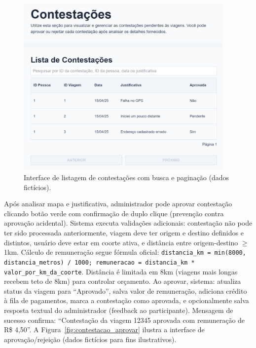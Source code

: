  \begin{figure}[H]
   \centering
   \includegraphics[width=0.95\textwidth]{figuras/contestacoes_listar.png}
   \caption{Interface de listagem de contestações com busca e paginação (dados fictícios).}
   \label{fig:contestacoes_listagem}
 \end{figure}



Após analisar mapa e justificativa, administrador pode aprovar contestação clicando botão verde com confirmação de duplo clique (prevenção contra aprovação acidental). Sistema executa validações adicionais: contestação não pode ter sido processada anteriormente, viagem deve ter origem e destino definidos e distintos, usuário deve estar em coorte ativa, e distância entre origem-destino $\geq$ 1km. Cálculo de remuneração segue fórmula oficial: \texttt{distancia\_km = min(8000, distancia\_metros) / 1000; remuneracao = distancia\_km * valor\_por\_km\_da\_coorte}. Distância é limitada em 8km (viagens mais longas recebem teto de 8km) para controlar orçamento. Ao aprovar, sistema: atualiza status da viagem para ``Aprovado'', salva valor de remuneração, adiciona crédito à fila de pagamentos, marca a contestação como aprovada, e opcionalmente salva resposta textual do administrador (feedback ao participante). Mensagem de sucesso confirma: ``Contestação da viagem 12345 aprovada com remuneração de R\$ 4,50''. A Figura~\ref{fig:contestacao_aprovar} ilustra a interface de aprovação/rejeição (dados fictícios para fins ilustrativos).

